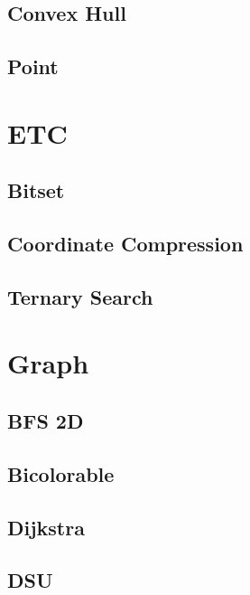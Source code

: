 \subsection{Convex Hull}
\raggedbottom
\hrulefill
\subsection{Point}
\raggedbottom
\hrulefill

\section{ETC}
\subsection{Bitset}
\raggedbottom
\hrulefill
\subsection{Coordinate Compression}
\raggedbottom
\hrulefill
\subsection{Ternary Search}
\raggedbottom
\hrulefill

\section{Graph}
\subsection{BFS 2D}
\raggedbottom
\hrulefill
\subsection{Bicolorable}
\raggedbottom
\hrulefill
\subsection{Dijkstra}
\raggedbottom
\hrulefill
\subsection{DSU}
\raggedbottom
\hrulefill
